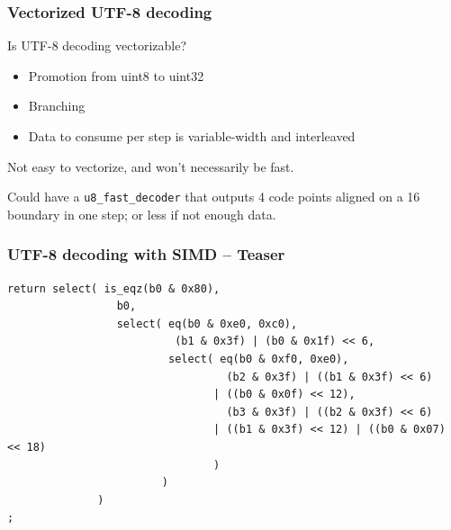 \documentclass{beamer}
\begin{document}
\begin{frame}
	\frametitle{Vectorized UTF-8 decoding}

	Is UTF-8 decoding vectorizable?
	\begin{itemize}
		\item Promotion from uint8 to uint32
		\item Branching
		\item Data to consume per step is variable-width and interleaved
	\end{itemize}
	\bigskip
	
	Not easy to vectorize, and won't necessarily be fast.
	\bigskip
	
	Could have a \lstinline{u8_fast_decoder} that outputs 4 code points aligned on a 16 boundary in one step; or less if not enough data.
\end{frame}

\begin{frame}[fragile]
	\frametitle{UTF-8 decoding with SIMD -- Teaser}

\begin{lstlisting}
return select( is_eqz(b0 & 0x80),
                 b0,
                 select( eq(b0 & 0xe0, 0xc0),
                          (b1 & 0x3f) | (b0 & 0x1f) << 6,
                         select( eq(b0 & 0xf0, 0xe0),
                                  (b2 & 0x3f) | ((b1 & 0x3f) << 6)
                                | ((b0 & 0x0f) << 12),
                                  (b3 & 0x3f) | ((b2 & 0x3f) << 6)
                                | ((b1 & 0x3f) << 12) | ((b0 & 0x07) << 18)
                                )
                        )
              )
;
\end{lstlisting}

\end{frame}
\end{document}

